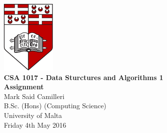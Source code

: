 \documentclass[12pt,a4paper,]{report}
\begin{document}
\begin{titlepage}
\vspace*{\fill}
\centering
\includegraphics[width=0.2\textwidth]{University_of_Malta_Logo}\\
\vspace*{3em}
\textbf{\LARGE CSA 1017 - Data Sturctures and Algorithms 1}\\
\vspace*{0.5em}
\textbf{\Large Assignment}\\
\vspace{3em}
\large Mark Said Camilleri\\
B.Sc. (Hons) (Computing Science)\\
University of Malta\\
\vspace*{1em}
Friday 4th May 2016
\vfill
\end{titlepage}
\pagebreak
\tableofcontents
{}




\printbibliography[title={References}]
\end{document}
